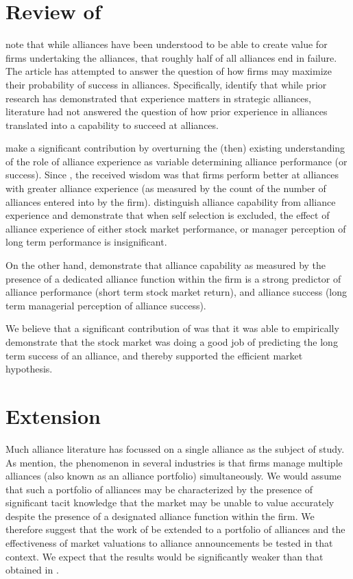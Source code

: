 \documentclass[12pt]{article}
\begin{document}
\section{Review of \cite{Kale2002}}
\cite{Kale2002} note that while alliances have been understood to be able to create value for firms undertaking the alliances, that roughly half of all alliances end in failure. The article has attempted to answer the question of how firms may maximize their probability of success in alliances. Specifically, \cite{Kale2002} identify that while prior research has demonstrated that experience matters in strategic alliances, literature had not answered the question of how prior experience in alliances translated into a capability to succeed at alliances.

\cite{Kale2002} make a significant contribution by overturning the (then) existing understanding of the role of alliance experience as variable determining alliance performance (or success). Since \cite{Gulati1995}, the received wisdom was that firms perform better at alliances with greater alliance experience (as measured by the count of the number of alliances entered into by the firm). \cite{Kale2002} distinguish alliance capability from alliance experience and demonstrate that when self selection is excluded, the effect of alliance experience of either stock market performance, or manager perception of long term performance  is insignificant.

On the other hand, \cite{Kale2002} demonstrate that alliance capability as measured by the presence of a dedicated alliance function within the firm is a strong predictor of alliance performance (short term stock market return), and alliance success (long term managerial perception of alliance success).

We believe that a significant contribution of \cite{Kale2002}  was that it was able to empirically demonstrate that the stock market was doing a good job of predicting the long term success of an alliance, and thereby supported the efficient market hypothesis.

\section{Extension}
Much alliance literature has focussed on a single alliance as the subject of study. As \cite{Kale2009} mention, the phenomenon in several industries is that firms manage multiple alliances (also known as an alliance portfolio) simultaneously. We would assume that such a portfolio of alliances may be characterized by the presence of significant tacit knowledge that the market may be unable to value accurately despite the presence of a designated alliance function within the firm. We therefore suggest that the work of \cite{Kale2002} be extended to a portfolio of alliances and the effectiveness of market valuations to alliance announcements be tested in that context. We expect that the results would be significantly weaker than that obtained in \cite{Kale2009}.

 

\end{document}
